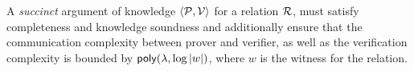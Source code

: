 A \emph{succinct} argument of knowledge $\langle\mathcal{P},\mathcal{V}\rangle$ for a relation $\mathcal{R}$, must satisfy completeness and knowledge soundness and additionally ensure that the communication complexity between prover and verifier, as well as the verification complexity is bounded by $\mathsf{poly}(\lambda,\log |w|)$, where $w$ is the witness for the relation.



